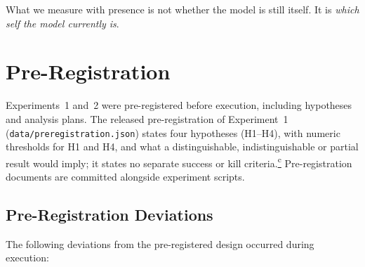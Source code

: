 \documentclass[11pt,a4paper]{article}
\newcommand{\corrmark}{\hyperref[sec:corrections]{\textsuperscript{c}}}
\begin{document}
What we measure with presence is not whether the model is still itself.
It is \emph{which self the model currently is}.

\section*{Pre-Registration}

Experiments~1 and~2 were pre-registered before execution, including
hypotheses and analysis plans. The released pre-registration of
Experiment~1 (\nolinkurl{data/preregistration.json}) states four
hypotheses (H1--H4), with numeric thresholds for H1 and H4, and what a
distinguishable, indistinguishable or partial result would imply; it
states no separate success or kill criteria.\corrmark{} Pre-registration
documents are committed alongside experiment scripts.

\subsection*{Pre-Registration Deviations}

The following deviations from the pre-registered design occurred during
execution:
\end{document}
